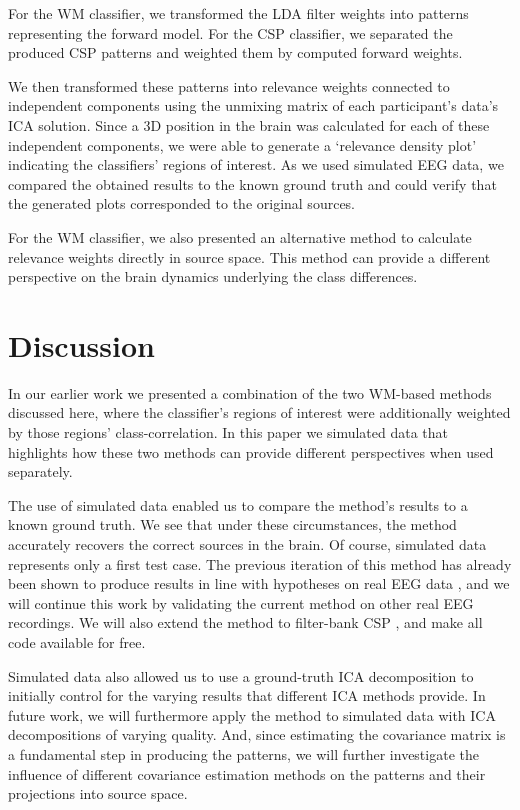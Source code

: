 For the WM classifier, we transformed the LDA filter weights into patterns representing the forward model. For the CSP classifier, we separated the produced CSP patterns and weighted them by computed forward weights.

We then transformed these patterns into relevance weights connected to independent components using the unmixing matrix of each participant's data's ICA solution. Since a 3D position in the brain was calculated for each of these independent components, we were able to generate a `relevance density plot' indicating the classifiers' regions of interest. As we used simulated EEG data, we compared the obtained results to the known ground truth and could verify that the generated plots corresponded to the original sources.  

For the WM classifier, we also presented an alternative method to calculate relevance weights directly in source space. This method can provide a different perspective on the brain dynamics underlying the class differences.


\section{Discussion}

In our earlier work \cite{zander2016nat} we presented a combination of the two WM-based methods discussed here, where the classifier's regions of interest were additionally weighted by those regions' class-correlation. In this paper we simulated data that highlights how these two methods can provide different perspectives when used separately.

The use of simulated data enabled us to compare the method's results to a known ground truth. We see that under these circumstances, the method accurately recovers the correct sources in the brain. Of course, simulated data represents only a first test case. The previous iteration of this method has already been shown to produce results in line with hypotheses on real EEG data \cite{zander2016nat}, and we will continue this work by validating the current method on other real EEG recordings. We will also extend the method to filter-bank CSP \cite{ang2008fbcsp}, and make all code available for free.

Simulated data also allowed us to use a ground-truth ICA decomposition to initially control for the varying results that different ICA methods provide. In future work, we will furthermore apply the method to simulated data with ICA decompositions of varying quality. And, since estimating the covariance matrix is a fundamental step in producing the patterns, we will further investigate the influence of different covariance estimation methods on the patterns and their projections into source space.

